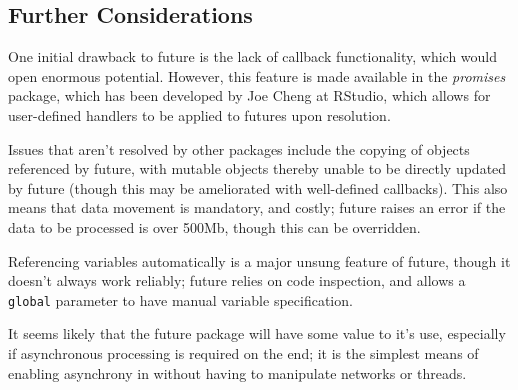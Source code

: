 \hypertarget{sec:further-considerations}{%
    \subsection{Further Considerations}\label{sec:further-considerations}}

One initial drawback to future is the lack of callback functionality,
which would open enormous potential. However, this feature is made
available in the \emph{promises} package, which has been developed by
Joe Cheng at RStudio, which allows for user-defined handlers to be
applied to futures upon resolution\cite{Cheng19}.

Issues that aren't resolved by other packages include the copying of
objects referenced by future, with mutable objects thereby unable to be
directly updated by future (though this may be ameliorated with
well-defined callbacks). This also means that data movement is
mandatory, and costly; future raises an error if the data to be
processed is over 500Mb, though this can be overridden.

Referencing variables automatically is a major unsung feature of future,
though it doesn't always work reliably; future relies on code
inspection, and allows a \texttt{global} parameter to have manual
variable specification.

It seems likely that the future package will have some value to it's
use, especially if asynchronous processing is required on the \R end; it
is the simplest means of enabling asynchrony in \R without having to
manipulate networks or threads.
